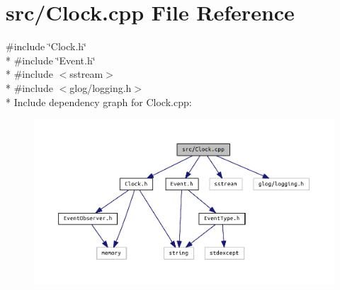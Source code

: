 \section{src/\+Clock.cpp File Reference}
\label{_clock_8cpp}
{\ttfamily \#include \char`\"{}Clock.\+h\char`\"{}}\\*
{\ttfamily \#include \char`\"{}Event.\+h\char`\"{}}\\*
{\ttfamily \#include $<$sstream$>$}\\*
{\ttfamily \#include $<$glog/logging.\+h$>$}\\*
Include dependency graph for Clock.\+cpp\+:\nopagebreak
\begin{figure}[H]
\begin{center}
\leavevmode
\includegraphics[width=350pt]{_clock_8cpp__incl}
\end{center}
\end{figure}
